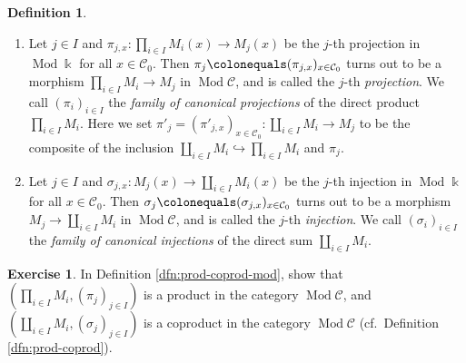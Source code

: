 \documentclass{surv-l}
\numberwithin{equation}{chapter}
\numberwithin{figure}{chapter}
\theoremstyle{plain}
\theoremstyle{definition}
\newtheorem{dfn}[thm]{Definition}
\newtheorem{exc}[thm]{Exercise}
\theoremstyle{remark}
\DeclareMathOperator{\Mod}{Mod}
\begin{document}
\begin{dfn}
\begin{enumerate}
\item
Let $j \in I$ and $\pi_{j,x} \colon \prod_{i \in I} M_i(x) \to M_j(x)$
be the $j$-th projection in $\Mod\Bbbk$  for all $x \in {\mathcal{C}}_0$.
Then $\pi_j\colonequals  (\pi_{j,x})_{x \in {\mathcal{C}}_0}$
turns out to be a morphism $\prod_{i \in I} M_i \to M_j$
in $\Mod{\mathcal{C}}$, and is called the $j$-th \emph{projection}.
We call $(\pi_i)_{i\in I}$ the \emph{family of canonical projections}
of the direct product $\prod_{i\in I}M_i$.
Here we set $\pi'_j = (\pi'_{j,x})_{x \in {\mathcal{C}}_0} \colon \coprod_{i \in I} M_i \to M_j$
to be the composite of the inclusion
$\coprod_{i \in I} M_i \hookrightarrow \prod_{i \in I} M_i$
and $\pi_j$.

\item
Let $j \in I$ and $\sigma_{j,x} \colon M_j(x) \to \coprod_{i \in I} M_i(x)$
be the $j$-th injection in $\Mod\Bbbk$ for all $x \in {\mathcal{C}}_0$.
Then $\sigma_j\colonequals  (\sigma_{j,x})_{x \in {\mathcal{C}}_0}$ turns out to be a morphism
$M_j \to \coprod_{i \in I} M_i$ in $\Mod{\mathcal{C}}$, and is called
the $j$-th \emph{injection}.
We call $(\sigma_i)_{i\in I}$ the \emph{family of canonical injections}
of the direct sum $\coprod_{i\in I}M_i$.
\end{enumerate}
\end{dfn}

\begin{exc}
In Definition \ref{dfn:prod-coprod-mod}, show that
$(\prod_{i\in I} M_i, (\pi_j)_{j \in I})$ is a product in the category $\Mod{\mathcal{C}}$,
and $(\coprod_{i\in I} M_i, (\sigma_j)_{j \in I})$ is a coproduct in the category
$\Mod{\mathcal{C}}$ (cf.\ Definition \ref{dfn:prod-coprod}).
\end{exc}
\end{document}
